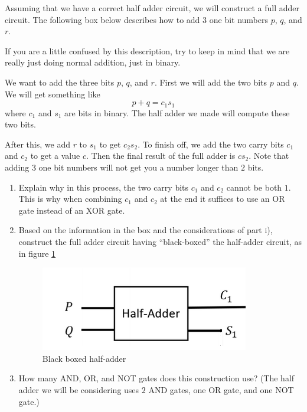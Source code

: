 Assuming that we have a correct half adder circuit, we will construct a full adder circuit. The following box below describes how to add 3 one bit numbers $p$, $q$, and $r$.

If you are a little confused by this description, try to keep in mind that we are really just doing normal addition, just in binary.
\begin{tcolorbox}
We want to add the three bits $p$, $q$, and $r$. First we will add the two bits $p$ and $q$. We will get something like 
\[p + q = c_1s_1\]
where $c_1$ and $s_1$ are bits in binary. The half adder we made will compute these two bits.

After this, we add $r$ to $s_1$ to get $c_2s_2$. To finish off, we add the two carry bits $c_1$ and $c_2$ to get a value $c$. Then the final result of the full adder is $cs_2$. Note that adding $3$ one bit numbers will not get you a number longer than $2$ bits.
\end{tcolorbox}
\begin{enumerate}
    \item Explain why in this process, the two carry bits $c_1$ and $c_2$ cannot be both $1$. This is why when combining $c_1$ and $c_2$ at the end it suffices to use an OR gate instead of an XOR gate.

    \item Based on the information in the box and the considerations of part i), construct the full adder circuit having ``black-boxed'' the half-adder circuit, as in figure \ref{fig:my_label}
    
    \begin{figure}[ht]
        \centering
        \includegraphics{Ch2/003.PNG}
        \caption{Black boxed half-adder}
        \label{fig:my_label}
    \end{figure}
    
    \item How many AND, OR, and NOT gates does this construction use? (The half adder we will be considering uses $2$ AND gates, one OR gate, and one NOT gate.)
\end{enumerate}